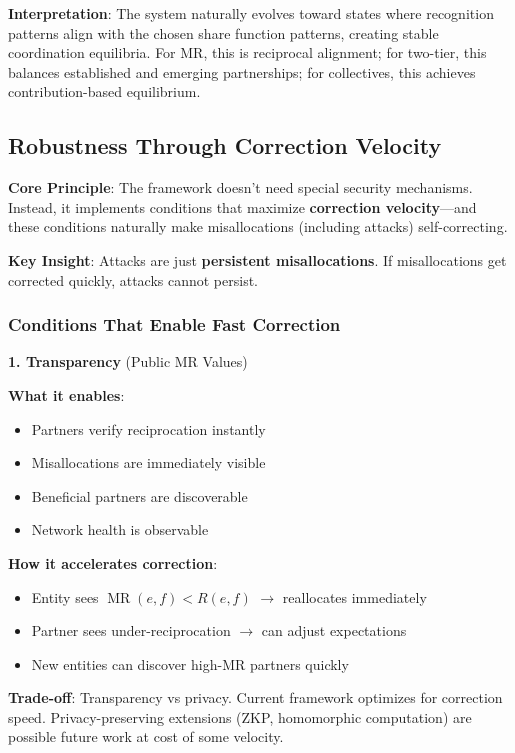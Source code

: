 \documentclass[11pt,a4paper]{article}
\theoremstyle{definition}
\theoremstyle{remark}
\DeclareMathOperator{\MR}{MR}
\begin{document}
\textbf{Interpretation}: The system naturally evolves toward states where recognition patterns align with the chosen share function patterns, creating stable coordination equilibria. For MR, this is reciprocal alignment; for two-tier, this balances established and emerging partnerships; for collectives, this achieves contribution-based equilibrium.

\subsection{Robustness Through Correction Velocity}
\label{sec:robustness}

\textbf{Core Principle}: The framework doesn't need special security mechanisms. Instead, it implements conditions that maximize \textbf{correction velocity}---and these conditions naturally make misallocations (including attacks) self-correcting.

\textbf{Key Insight}: Attacks are just \textbf{persistent misallocations}. If misallocations get corrected quickly, attacks cannot persist.

\subsubsection{Conditions That Enable Fast Correction}

\textbf{1. Transparency} (Public MR Values)

\textbf{What it enables}:
\begin{itemize}
\item Partners verify reciprocation instantly
\item Misallocations are immediately visible
\item Beneficial partners are discoverable
\item Network health is observable
\end{itemize}

\textbf{How it accelerates correction}:
\begin{itemize}
\item Entity sees $\MR(e,f) < R(e,f)$ $\rightarrow$ reallocates immediately
\item Partner sees under-reciprocation $\rightarrow$ can adjust expectations
\item New entities can discover high-MR partners quickly
\end{itemize}

\textbf{Trade-off}: Transparency vs privacy. Current framework optimizes for correction speed. Privacy-preserving extensions (ZKP, homomorphic computation) are possible future work at cost of some velocity.
\end{document}
